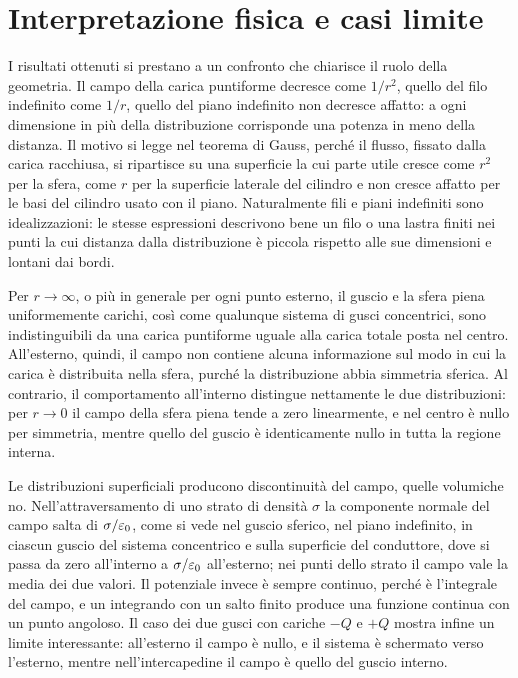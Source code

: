 \documentclass[11pt,a4paper]{article}
\begin{document}
\section*{Interpretazione fisica e casi limite}

I risultati ottenuti si prestano a un confronto che chiarisce il ruolo della geometria. Il campo della carica puntiforme decresce come $1/r^2$, quello del filo indefinito come $1/r$, quello del piano indefinito non decresce affatto: a ogni dimensione in più della distribuzione corrisponde una potenza in meno della distanza. Il motivo si legge nel teorema di Gauss, perché il flusso, fissato dalla carica racchiusa, si ripartisce su una superficie la cui parte utile cresce come $r^2$ per la sfera, come $r$ per la superficie laterale del cilindro e non cresce affatto per le basi del cilindro usato con il piano. Naturalmente fili e piani indefiniti sono idealizzazioni: le stesse espressioni descrivono bene un filo o una lastra finiti nei punti la cui distanza dalla distribuzione è piccola rispetto alle sue dimensioni e lontani dai bordi.

Per $r\to\infty$, o più in generale per ogni punto esterno, il guscio e la sfera piena uniformemente carichi, così come qualunque sistema di gusci concentrici, sono indistinguibili da una carica puntiforme uguale alla carica totale posta nel centro. All'esterno, quindi, il campo non contiene alcuna informazione sul modo in cui la carica è distribuita nella sfera, purché la distribuzione abbia simmetria sferica. Al contrario, il comportamento all'interno distingue nettamente le due distribuzioni: per $r\to0$ il campo della sfera piena tende a zero linearmente, e nel centro è nullo per simmetria, mentre quello del guscio è identicamente nullo in tutta la regione interna.

Le distribuzioni superficiali producono discontinuità del campo, quelle volumiche no. Nell'attraversamento di uno strato di densità $\sigma$ la componente normale del campo salta di $\sigma/\varepsilon_0$, come si vede nel guscio sferico, nel piano indefinito, in ciascun guscio del sistema concentrico e sulla superficie del conduttore, dove si passa da zero all'interno a $\sigma/\varepsilon_0$ all'esterno; nei punti dello strato il campo vale la media dei due valori. Il potenziale invece è sempre continuo, perché è l'integrale del campo, e un integrando con un salto finito produce una funzione continua con un punto angoloso. Il caso dei due gusci con cariche $-Q$ e $+Q$ mostra infine un limite interessante: all'esterno il campo è nullo, e il sistema è schermato verso l'esterno, mentre nell'intercapedine il campo è quello del guscio interno.
\end{document}
